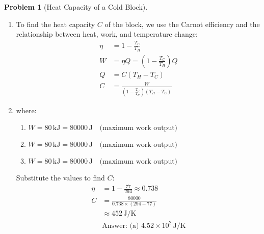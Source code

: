 \documentclass[12pt]{article}
\theoremstyle{definition} %
\newtheorem{problem}{Problem}
\theoremstyle{plain} %
\begin{document}
\begin{problem}[Heat Capacity of a Cold Block]
    \noindent
    \begin{enumerate}
        \item 
        To find the heat capacity \( C \) of the block, we use the Carnot efficiency and the relationship between heat, work, and temperature change:
        \begin{align*}
        \eta &= 1 - \frac{T_C}{T_H} \\
        W &= \eta Q = \left(1 - \frac{T_C}{T_H}\right) Q \\
        Q &= C (T_H - T_C) \\
        C &= \frac{W}{\left(1 - \frac{T_C}{T_H}\right)(T_H - T_C)}
        \end{align*}
        \item where: \begin{enumerate}
            \item \( W = 80 \, \text{kJ} = 80000 \, \text{J} \quad \text{(maximum work output)} \) 
            \item \( W = 80 \, \text{kJ} = 80000 \, \text{J} \quad \text{(maximum work output)} \) 
            \item \( W = 80 \, \text{kJ} = 80000 \, \text{J} \quad \text{(maximum work output)} \)  
        \end{enumerate}
        Substitute the values to find \( C \):
        \begin{align*}
        \eta &= 1 - \frac{77}{294} \approx 0.738 \\
        C &= \frac{80000}{0.738 \times (294 - 77)} \\
        &\approx 452 \, \text{J/K} \\
        &\text{Answer: (a) } 4.52 \times 10^2 \, \text{J/K}
        \end{align*}
    \end{enumerate}
\end{problem}
\end{document}

